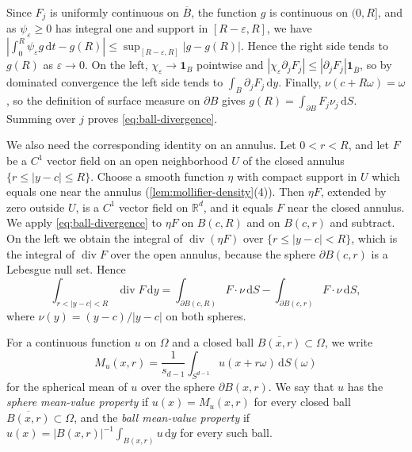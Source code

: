 Since $F_j$ is uniformly continuous on $\overline B$, the function $g$ is continuous on $(0,R]$, and as $\psi_\varepsilon\geq0$ has integral one and support in $[R-\varepsilon,R]$, we have $|\int_0^R\psi_\varepsilon g\,\mathrm dt-g(R)|\leq\sup_{[R-\varepsilon,R]}|g-g(R)|$. Hence the right side tends to $g(R)$ as $\varepsilon\to0$. On the left, $\chi_\varepsilon\to\mathbf1_B$ pointwise and $|\chi_\varepsilon\partial_jF_j|\leq|\partial_jF_j|\mathbf1_{\overline B}$, so by dominated convergence the left side tends to $\int_B\partial_jF_j\,\mathrm dy$. Finally, $\nu(c+R\omega)=\omega$, so the definition of surface measure on $\partial B$ gives $g(R)=\int_{\partial B}F_j\nu_j\,\mathrm dS$. Summing over $j$ proves \eqref{eq:ball-divergence}.

We also need the corresponding identity on an annulus. Let $0<r<R$, and let $F$ be a $C^1$ vector field on an open neighborhood $U$ of the closed annulus $\{r\leq|y-c|\leq R\}$. Choose a smooth function $\eta$ with compact support in $U$ which equals one near the annulus (\cref{lem:mollifier-density}(4)). Then $\eta F$, extended by zero outside $U$, is a $C^1$ vector field on $\mathbb R^d$, and it equals $F$ near the closed annulus. We apply \eqref{eq:ball-divergence} to $\eta F$ on $B(c,R)$ and on $B(c,r)$ and subtract. On the left we obtain the integral of $\operatorname{div}(\eta F)$ over $\{r\leq|y-c|<R\}$, which is the integral of $\operatorname{div}F$ over the open annulus, because the sphere $\partial B(c,r)$ is a Lebesgue null set. Hence
\begin{equation}\label{eq:annulus-divergence}
 \int_{r<|y-c|<R}\operatorname{div}F\,\mathrm dy=\int_{\partial B(c,R)}F\cdot\nu\,\mathrm dS-\int_{\partial B(c,r)}F\cdot\nu\,\mathrm dS,
\end{equation}
where $\nu(y)=(y-c)/|y-c|$ on both spheres.

For a continuous function $u$ on $\Omega$ and a closed ball $\overline{B(x,r)}\subset\Omega$, we write
\[
 M_u(x,r)=\frac{1}{s_{d-1}}\int_{S^{d-1}}u(x+r\omega)\,\mathrm d S(\omega)
\]
for the spherical mean of $u$ over the sphere $\partial B(x,r)$. We say that $u$ has the \emph{sphere mean-value property} if $u(x)=M_u(x,r)$ for every closed ball $\overline{B(x,r)}\subset\Omega$, and the \emph{ball mean-value property} if $u(x)=|B(x,r)|^{-1}\int_{B(x,r)}u\,\mathrm dy$ for every such ball.

